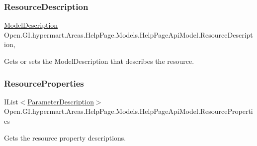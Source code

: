 \subsubsection{\texorpdfstring{Resource\+Description}{ResourceDescription}}
{\footnotesize\ttfamily \hyperlink{class_open_1_1_g_i_1_1hypermart_1_1_areas_1_1_help_page_1_1_model_descriptions_1_1_model_description}{Model\+Description} Open.\+G\+I.\+hypermart.\+Areas.\+Help\+Page.\+Models.\+Help\+Page\+Api\+Model.\+Resource\+Description\hspace{0.3cm}{\ttfamily [get]}, {\ttfamily [set]}}



Gets or sets the Model\+Description that describes the resource. 

\hypertarget{class_open_1_1_g_i_1_1hypermart_1_1_areas_1_1_help_page_1_1_models_1_1_help_page_api_model_a1fc678443900b538ee0b4bbd22e9b4d3}{}\label{class_open_1_1_g_i_1_1hypermart_1_1_areas_1_1_help_page_1_1_models_1_1_help_page_api_model_a1fc678443900b538ee0b4bbd22e9b4d3} 
\subsubsection{\texorpdfstring{Resource\+Properties}{ResourceProperties}}
{\footnotesize\ttfamily I\+List$<$\hyperlink{class_open_1_1_g_i_1_1hypermart_1_1_areas_1_1_help_page_1_1_model_descriptions_1_1_parameter_description}{Parameter\+Description}$>$ Open.\+G\+I.\+hypermart.\+Areas.\+Help\+Page.\+Models.\+Help\+Page\+Api\+Model.\+Resource\+Properties\hspace{0.3cm}{\ttfamily [get]}}



Gets the resource property descriptions. 

\hypertarget{class_open_1_1_g_i_1_1hypermart_1_1_areas_1_1_help_page_1_1_models_1_1_help_page_api_model_a5ba6db9c9586dc77949e8d824cca46b3}{}\label{class_open_1_1_g_i_1_1hypermart_1_1_areas_1_1_help_page_1_1_models_1_1_help_page_api_model_a5ba6db9c9586dc77949e8d824cca46b3} 

